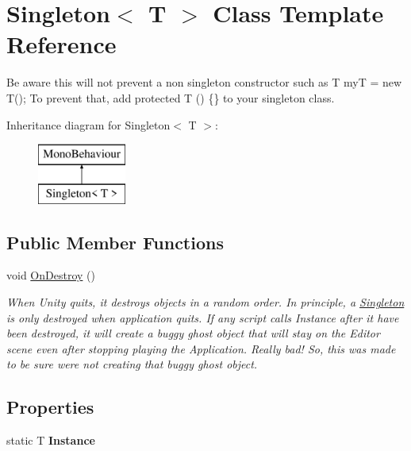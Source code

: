 \hypertarget{class_singleton}{}\section{Singleton$<$ T $>$ Class Template Reference}
\label{class_singleton}


Be aware this will not prevent a non singleton constructor such as {\ttfamily T myT = new T();} To prevent that, add {\ttfamily protected T () \{\}} to your singleton class.  


Inheritance diagram for Singleton$<$ T $>$\+:\begin{figure}[H]
\begin{center}
\leavevmode
\includegraphics[height=2.000000cm]{class_singleton}
\end{center}
\end{figure}
\subsection*{Public Member Functions}
\begin{DoxyCompactItemize}
\item 
void \hyperlink{class_singleton_a81a4ea792b927aeae3f52c1e0d2036af}{On\+Destroy} ()
\begin{DoxyCompactList}\small\item\em When Unity quits, it destroys objects in a random order. In principle, a \hyperlink{class_singleton}{Singleton} is only destroyed when application quits. If any script calls Instance after it have been destroyed, it will create a buggy ghost object that will stay on the Editor scene even after stopping playing the Application. Really bad! So, this was made to be sure we\textquotesingle{}re not creating that buggy ghost object. \end{DoxyCompactList}\end{DoxyCompactItemize}
\subsection*{Properties}
\begin{DoxyCompactItemize}
\item 
\mbox{\label{class_singleton_a54103e8475b2a352ee759d5732307534}} 
static T {\bfseries Instance}
\end{DoxyCompactItemize}


